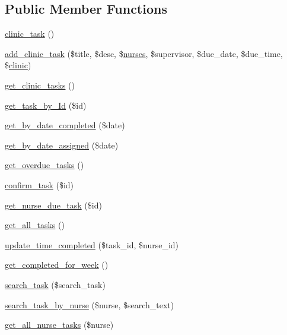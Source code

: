 \subsection*{Public Member Functions}
\begin{DoxyCompactItemize}
\item 
\hyperlink{classclinic__task_ad45ccdef499f67301361bb62e2e3b477}{clinic\+\_\+task} ()
\item 
\hyperlink{classclinic__task_a9a390919bc9e593044b5836f4a2e5264}{add\+\_\+clinic\+\_\+task} (\$title, \$desc, \$\hyperlink{classnurses}{nurses}, \$supervisor, \$due\+\_\+date, \$due\+\_\+time, \$\hyperlink{classclinic}{clinic})
\item 
\hyperlink{classclinic__task_a87ee712ccf8a72ca3bec7582c06b3d3f}{get\+\_\+clinic\+\_\+tasks} ()
\item 
\hyperlink{classclinic__task_a9e8f0e21c1b1e1a545d578c735b76af2}{get\+\_\+task\+\_\+by\+\_\+\+Id} (\$id)
\item 
\hyperlink{classclinic__task_a44e46a0dc086799f3d9de01528c8474c}{get\+\_\+by\+\_\+date\+\_\+completed} (\$date)
\item 
\hyperlink{classclinic__task_a5d07bb4142d15f2a45d6fc458cce448d}{get\+\_\+by\+\_\+date\+\_\+assigned} (\$date)
\item 
\hyperlink{classclinic__task_aca978c43dcfc293c370021c5dc919eb3}{get\+\_\+overdue\+\_\+tasks} ()
\item 
\hyperlink{classclinic__task_a7c3ea25b6ad1b4f8844a59a2ac545369}{confirm\+\_\+task} (\$id)
\item 
\hyperlink{classclinic__task_a6df8415e5c1c1c71ae0fcbf1d0283d9d}{get\+\_\+nurse\+\_\+due\+\_\+task} (\$id)
\item 
\hyperlink{classclinic__task_a21262aed6c7561cbf841233299cb6c63}{get\+\_\+all\+\_\+tasks} ()
\item 
\hyperlink{classclinic__task_af449944c89fdf56326b49f8681e422df}{update\+\_\+time\+\_\+completed} (\$task\+\_\+id, \$nurse\+\_\+id)
\item 
\hyperlink{classclinic__task_a3eead44cbde40578ca0709dfcd894625}{get\+\_\+completed\+\_\+for\+\_\+week} ()
\item 
\hyperlink{classclinic__task_a12aad76a7529187c159ab4110384cd00}{search\+\_\+task} (\$search\+\_\+task)
\item 
\hyperlink{classclinic__task_af1f566a47278e8a7fb84ad8aa9cd619d}{search\+\_\+task\+\_\+by\+\_\+nurse} (\$nurse, \$search\+\_\+text)
\item 
\hyperlink{classclinic__task_aacbcb37bad746858047d29bb313bea16}{get\+\_\+all\+\_\+nurse\+\_\+tasks} (\$nurse)
\end{DoxyCompactItemize}
